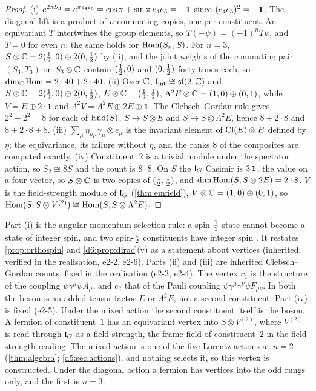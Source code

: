 \begin{proof}
(i) $e^{2\pi S_3}=e^{\pi e_4e_5}=\cos\pi+\sin\pi\,e_4e_5=-\mathbf 1$ since $(e_4e_5)^2=-\mathbf 1$. The diagonal lift is a product of $n$ commuting copies,
one per constituent. An equivariant $T$ intertwines the group elements, so $T(-\psi)=(-1)^nT\psi$, and $T=0$ for even $n$; the same holds for
$\operatorname{Hom}(S_n,S)$. For $n=3$, $S\otimes\mathbb{C}=2(\tfrac12,0)\oplus2(0,\tfrac12)$ by (ii), and the joint weights of the commuting pair $(S_3,T_3)$ on $S_3\otimes\mathbb{C}$
contain $(\tfrac12,0)$ and $(0,\tfrac12)$ forty times each, so $\dim_{\mathbb{C}}\operatorname{Hom}=2\cdot40+2\cdot40$. (ii) Over $\mathbb{C}$, $\mathfrak l_{\rm int}\cong\mathfrak{sl}(2,\mathbb{C})$ and
$S\otimes\mathbb{C}=2(\tfrac12,0)\oplus2(0,\tfrac12)$, $E\otimes\mathbb{C}=(\tfrac12,\tfrac12)$, $\Lambda^2E\otimes\mathbb{C}=(1,0)\oplus(0,1)$, while $V=E\oplus2\cdot\mathbf1$ and
$\Lambda^2V=\Lambda^2E\oplus2E\oplus\mathbf1$. The Clebsch--Gordan rule gives $2^2+2^2=8$ for each of $\operatorname{End}(S)$, $S\to S\otimes E$ and $S\to S\otimes\Lambda^2E$,
hence $8+2\cdot8$ and $8+2\cdot8+8$. (iii) $\sum_\mu\eta_{\mu\mu}\gamma_\mu\otimes e_\mu$ is the invariant element of $\mathrm{Cl}(E)\otimes E$ defined by $\eta$; the
equivariance, its failure without $\eta$, and the ranks $8$ of the composites are computed exactly. (iv) Constituent~$2$ is a trivial
module under the spectator action, so $S_2\cong8S$ and the count is $8\cdot8$. On $S$ the $\mathfrak l_G$ Casimir is $3\,\mathbf 1$, the value on a
four-vector, so $S\otimes\mathbb{C}$ is two copies of $(\tfrac12,\tfrac12)$, and $\dim\operatorname{Hom}(S,S\otimes2E)=2\cdot8$. $V$ is the field-strength module of $\mathfrak l_G$
(\cref{thm:emfield}), $V\otimes\mathbb{C}=(1,0)\oplus(0,1)$, so $\operatorname{Hom}(S,S\otimes V^{(2)})\cong\operatorname{Hom}(S,S\otimes\Lambda^2E)$.
\end{proof}

Part (i) is the angular-momentum selection rule: a spin-$\tfrac12$ state cannot become a state of integer spin, and two spin-$\tfrac12$
constituents have integer spin \cite{EhrenfestOppenheimer31,WeinbergQFT}. It restates \cref{prop:orthospin} and
\cref{d6:prop:dirac}(v) as a statement about vertices (inherited; verified in the realisation, e2-2, e2-6). Parts (ii) and (iii) are
inherited Clebsch--Gordan counts, fixed in the realisation (e2-3, e2-4). The vertex $c_1$ is the structure of the coupling
$\bar\psi\gamma^\mu\psi A_\mu$, and $c_2$ that of the Pauli coupling $\bar\psi\gamma^\mu\gamma^\nu\psi F_{\mu\nu}$. In both the boson is an
added tensor factor $E$ or $\Lambda^2E$, not a second constituent. Part (iv) is fixed (e2-5). Under the mixed action the second constituent
itself is the boson. A fermion of constituent~$1$ has an equivariant vertex into $S\otimes V^{(2)}$, where $V^{(2)}$ is read through $\mathfrak l_G$ as a
field strength, the frame field of constituent~$2$ in the field-strength reading. The mixed action is one of the five Lorentz actions at
$n=2$ (\cref{thm:algebra}; \cref{d5:sec:actions}), and nothing selects it, so this vertex is constructed. Under the diagonal action a
fermion has vertices into the odd rungs only, and the first is $n=3$.

